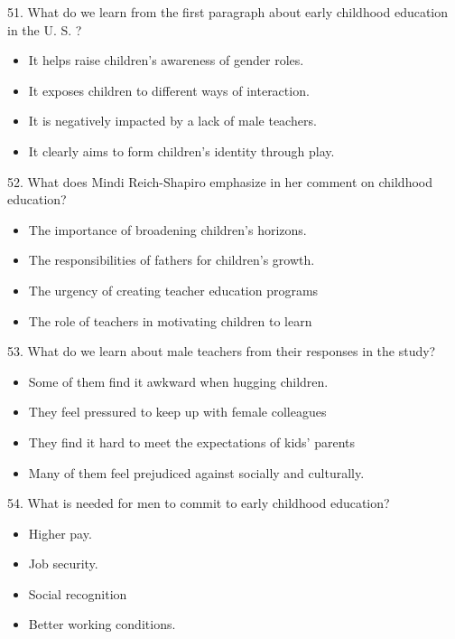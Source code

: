 \documentclass[UTF8,11pt]{ctexart}
\begin{document}
51. What do we learn from the first paragraph about early childhood education in the U. S. ?


\begin{itemize}[leftmargin=2em,itemsep=.2em,topsep=.4em]\item[A.] It helps raise children's awareness of gender roles.
\item[B.] It exposes children to different ways of interaction.
\item[C.] It is negatively impacted by a lack of male teachers.
\end{itemize}

\begin{itemize}[leftmargin=2em,itemsep=.2em,topsep=.4em]\item[D.] It clearly aims to form children's identity through play.
\end{itemize}

52. What does Mindi Reich-Shapiro emphasize in her comment on childhood education?


\begin{itemize}[leftmargin=2em,itemsep=.2em,topsep=.4em]\item[A.] The importance of broadening children's horizons.
\item[B.] The responsibilities of fathers for children's growth.
\item[C.] The urgency of creating teacher education programs
\item[D.] The role of teachers in motivating children to learn
\end{itemize}

53. What do we learn about male teachers from their responses in the study?


\begin{itemize}[leftmargin=2em,itemsep=.2em,topsep=.4em]\item[A.] Some of them find it awkward when hugging children.
\item[B.] They feel pressured to keep up with female colleagues
\item[C.] They find it hard to meet the expectations of kids' parents
\item[D.] Many of them feel prejudiced against socially and culturally.
\end{itemize}

54. What is needed for men to commit to early childhood education?


\begin{itemize}[leftmargin=2em,itemsep=.2em,topsep=.4em]\item[A.] Higher pay.
\item[B.] Job security.
\item[C.] Social recognition
\item[D.] Better working conditions.
\end{itemize}
\end{document}
